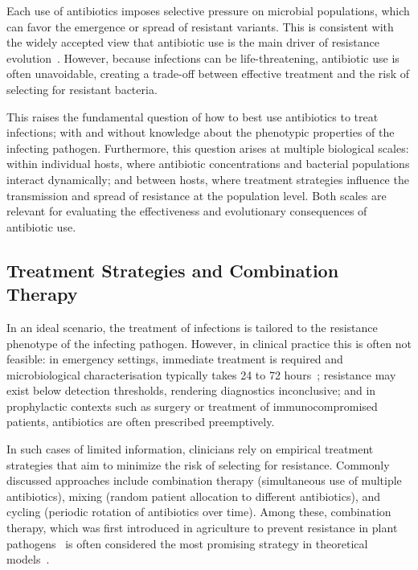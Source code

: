 \documentclass[../main.tex]{subfiles}
\begin{document}
Each use of antibiotics imposes selective pressure on microbial populations, which can favor the emergence or spread of resistant variants.
This is consistent with the widely accepted view that antibiotic use is the main driver of resistance evolution~\cite{Rahman2023}.
However, because infections can be life-threatening, antibiotic use is often unavoidable, creating a trade-off between effective treatment and the risk of selecting for resistant bacteria.

This raises the fundamental question of how to best use antibiotics to treat infections; with and without knowledge about the phenotypic properties of the infecting pathogen.
Furthermore, this question arises at multiple biological scales: within individual hosts, where antibiotic concentrations and bacterial populations interact dynamically; and between hosts, where treatment strategies influence the transmission and spread of resistance at the population level.
Both scales are relevant for evaluating the effectiveness and evolutionary consequences of antibiotic use.

\subsection{Treatment Strategies and Combination Therapy}
In an ideal scenario, the treatment of infections is tailored to the resistance phenotype of the infecting pathogen.
However, in clinical practice this is often not feasible: in emergency settings, immediate treatment is required and microbiological characterisation typically takes 24 to 72 hours~\cite{Leekha2011}; resistance may exist below detection thresholds, rendering diagnostics inconclusive; and in prophylactic contexts such as surgery or treatment of immunocompromised patients, antibiotics are often prescribed preemptively.

In such cases of limited information, clinicians rely on empirical treatment strategies that aim to minimize the risk of selecting for resistance.
Commonly discussed approaches include combination therapy (simultaneous use of multiple antibiotics), mixing (random patient allocation to different antibiotics), and cycling (periodic rotation of antibiotics over time).
Among these, combination therapy, which was first introduced in agriculture to prevent resistance in plant pathogens~\cite{Kable1980, Delp1980, Skylakakis1981} is often considered the most promising strategy in theoretical models~\cite{Bonhoeffer1997, Tepekule2017,Uecker2021}.
\end{document}
